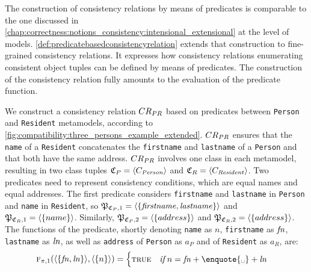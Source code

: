 The construction of consistency relations by means of predicates is comparable to the one discussed in \autoref{chap:correctness:notions_consistency:intensional_extensional} at the level of models.
\autoref{def:predicatebasedconsistencyrelation} extends that construction to fine-grained consistency relations.
It expresses how consistency relations enumerating consistent object tuples can be defined by means of predicates. %
The construction of the consistency relation fully amounts to the evaluation of the predicate function.

\begin{example}
We construct a consistency relation $\consistencyrelation{CR}{PR}$ based on predicates between \texttt{Person} and \texttt{Resident} metamodels, according to \autoref{fig:compatibility:three_persons_example_extended}. 
$\consistencyrelation{CR}{PR}$ ensures that the \texttt{name} of a \texttt{Resident} concatenates the \texttt{firstname} and \texttt{lastname} of a \texttt{Person} and that both have the same address. 
$\consistencyrelation{CR}{PR}$ involves one class in each metamodel, resulting in two class tuples $\classtuple{C}{P} = \tupled{\class{C}{\mathvariable{Person}}}$ and $\classtuple{C}{R} = \tupled{\class{c}{\mathvariable{Resident}}}$. 
Two predicates need to represent consistency conditions, which are equal names and equal addresses.
The first predicate considers \texttt{firstname} and \texttt{lastname} in \texttt{Person} and \texttt{name} in \texttt{Resident}, so $\propertysettuple{P}{\classtuple{C}{P}, 1} = \tupled{\setted{\mathvariable{firstname}, \mathvariable{lastname}}}$ and $\propertysettuple{P}{\classtuple{C}{R}, 1} = \tupled{\setted{name}}$. 
Similarly, $\propertysettuple{P}{\classtuple{C}{P}, 2} = \tupled{\setted{address}}$ and $\propertysettuple{P}{\classtuple{C}{R}, 2} = \tupled{\setted{address}}$.
The functions of the predicate, shortly denoting \texttt{name} as $n$, \texttt{firstname} as $\mathit{fn}$, \texttt{lastname} as $\mathit{ln}$, as well as \texttt{address} of \texttt{Person} as $a_P$ and of \texttt{Resident} as $a_R$, are:
\begin{align*}
   &
   \function{f}_{\pi, 1}(\tupled{\setted{\mathvariable{fn}, \mathvariable{ln}}}, \tupled{\setted{n}}) = \begin{cases} 
      \textsc{true} & \mathtextspaceafter{if} n = \mathvariable{fn} + \textnormal{\enquote{\textvisiblespace}} + \mathvariable{ln} \\

\end{cases}
\end{align*}
\end{example}
